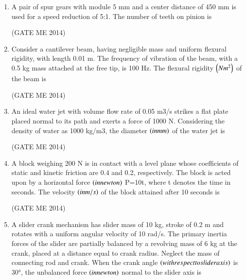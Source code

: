 \documentclass[journal]{IEEEtran}
\numberwithin{equation}{enumi}
\numberwithin{figure}{enumi}
\begin{document}
\begin{enumerate}
 \hfill{(GATE ME 2014)}
 
\begin{multicols}{4}
    \begin{enumerate}
        \item 0.69
        \item 0.88
        \item 0.98
        \item 1.37
    \end{enumerate}
\end{multicols}

\item A pair of spur gears with module 5 mm and a center distance of 450 mm is used for a speed
reduction of 5:1. The number of teeth on pinion is

 \hfill{(GATE ME 2014)}
 
\item Consider a cantilever beam, having negligible mass and uniform flexural rigidity, with length
0.01 m. The frequency of vibration of the beam, with a 0.5 kg mass attached at the free tip, is
100 Hz. The flexural rigidity $\left(Nm^2\right)$ of the beam is

 \hfill{(GATE ME 2014)}
 
\item An ideal water jet with volume flow rate of 0.05 m3/s strikes a flat plate placed normal to its path
and exerts a force of 1000 N. Considering the density of water as 1000 kg/m3, the diameter $\left(in mm\right)$
of the water jet is

 \hfill{(GATE ME 2014)}
 
\item A block weighing 200 N is in contact with a level plane whose coefficients of static and kinetic
friction are 0.4 and 0.2, respectively. The block is acted upon by a horizontal force $\left(in newton\right)$
P=10t, where t denotes the time in seconds. The velocity $\left(in m/s\right)$
 of the block attained after
10 seconds is

 \hfill{(GATE ME 2014)}
 
\item A slider crank mechanism has slider mass of 10 kg, stroke of 0.2 m and rotates with a uniform
angular velocity of 10 rad/s. The primary inertia forces of the slider are partially balanced by a
revolving mass of 6 kg at the crank, placed at a distance equal to crank radius. Neglect the mass of
connecting rod and crank. When the crank angle $\left(with respect to slider axis\right)$ is 30°, the unbalanced
force $\left(in newton\right)$ normal to the slider axis is


\end{enumerate}
\end{document}
